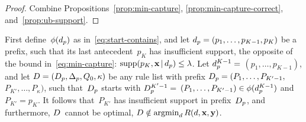 \begin{arxiv}
\begin{proof}
Combine Propositions~\ref{prop:min-capture},
\ref{prop:min-capture-correct}, and~\ref{prop:ub-support}.
\end{proof}

\begin{proposition}
\label{prop:min-capture}
First define~$\phi(d_p)$ as in~\eqref{eq:start-contains},
and let ${d_p = (p_1, \dots, p_{K-1}, p_{K})}$ be a prefix,
such that its last antecedent~$p_{K}$ has insufficient support,
\ie the opposite of the bound in~\eqref{eq:min-capture}:
${\textnormal{supp}(p_K, \mathbf{x} \,|\, d_p) \le {\lambda}}$.
%
Let ${d_p^{K-1} =}$ ${(p_1, \dots, p_{K-1})}$,
and let ${{D} = (D_p, \Delta_p, Q_0, \kappa)}$
be any rule list with prefix
${D_p = (P_1, \dots, P_{K'-1},}$ ${P_{K'}, \dots, P_{\kappa})}$,
such that~$D_p$ starts with ${D_p^{K'-1} =}$
${(P_1, \dots, P_{K'-1}) \in \phi(d_p^{K-1})}$
and~${P_{K'} = p_{K}}$.
%
It follows that~$P_{K'}$ has insufficient support in
prefix~$D_p$, and furthermore, ${D}$~cannot be optimal,
\ie ${{D} \notin \operatorname*{argmin}_{{d}} R({d}, \mathbf{x}, \mathbf{y})}$.
\end{proposition}


\end{arxiv}
